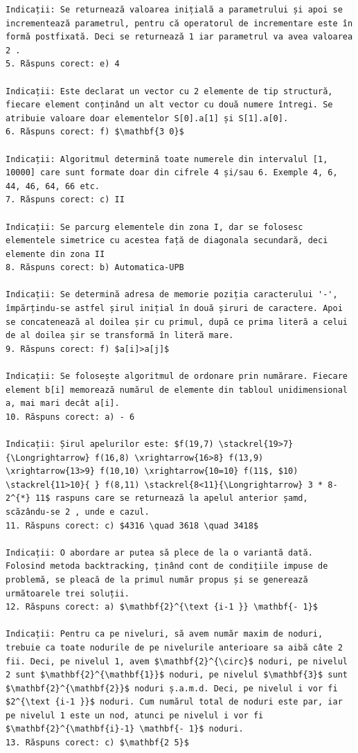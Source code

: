 \documentclass[10pt]{article}
\begin{document}
\begin{verbatim}
Indicații: Se returnează valoarea inițială a parametrului și apoi se incrementează parametrul, pentru că operatorul de incrementare este în formă postfixată. Deci se returnează 1 iar parametrul va avea valoarea 2 .
5. Răspuns corect: e) 4

Indicații: Este declarat un vector cu 2 elemente de tip structură, fiecare element conținând un alt vector cu două numere întregi. Se atribuie valoare doar elementelor S[0].a[1] și S[1].a[0].
6. Răspuns corect: f) $\mathbf{3 0}$

Indicații: Algoritmul determină toate numerele din intervalul [1, 10000] care sunt formate doar din cifrele 4 și/sau 6. Exemple 4, 6, 44, 46, 64, 66 etc.
7. Răspuns corect: c) II

Indicații: Se parcurg elementele din zona I, dar se folosesc elementele simetrice cu acestea față de diagonala secundară, deci elemente din zona II
8. Răspuns corect: b) Automatica-UPB

Indicații: Se determină adresa de memorie poziția caracterului '-', împărțindu-se astfel șirul inițial în două șiruri de caractere. Apoi se concatenează al doilea șir cu primul, după ce prima literă a celui de al doilea șir se transformă în literă mare.
9. Răspuns corect: f) $a[i]>a[j]$

Indicații: Se folosește algoritmul de ordonare prin numărare. Fiecare element b[i] memorează numărul de elemente din tabloul unidimensional a, mai mari decât a[i].
10. Răspuns corect: a) - 6

Indicații: Șirul apelurilor este: $f(19,7) \stackrel{19>7}{\Longrightarrow} f(16,8) \xrightarrow{16>8} f(13,9) \xrightarrow{13>9} f(10,10) \xrightarrow{10=10} f(11$, $10) \stackrel{11>10}{ } f(8,11) \stackrel{8<11}{\Longrightarrow} 3 * 8-2^{*} 11$ raspuns care se returnează la apelul anterior șamd, scăzându-se 2 , unde e cazul.
11. Răspuns corect: c) $4316 \quad 3618 \quad 3418$

Indicații: O abordare ar putea să plece de la o variantă dată. Folosind metoda backtracking, ținând cont de condițiile impuse de problemă, se pleacă de la primul număr propus și se generează următoarele trei soluții.
12. Răspuns corect: a) $\mathbf{2}^{\text {i-1 }} \mathbf{- 1}$

Indicații: Pentru ca pe niveluri, să avem număr maxim de noduri, trebuie ca toate nodurile de pe nivelurile anterioare sa aibă câte 2 fii. Deci, pe nivelul 1, avem $\mathbf{2}^{\circ}$ noduri, pe nivelul 2 sunt $\mathbf{2}^{\mathbf{1}}$ noduri, pe nivelul $\mathbf{3}$ sunt $\mathbf{2}^{\mathbf{2}}$ noduri ș.a.m.d. Deci, pe nivelul i vor fi $2^{\text {i-1 }}$ noduri. Cum numărul total de noduri este par, iar pe nivelul 1 este un nod, atunci pe nivelul i vor fi $\mathbf{2}^{\mathbf{i}-1} \mathbf{- 1}$ noduri.
13. Răspuns corect: c) $\mathbf{2 5}$


\end{verbatim}
\end{document}
